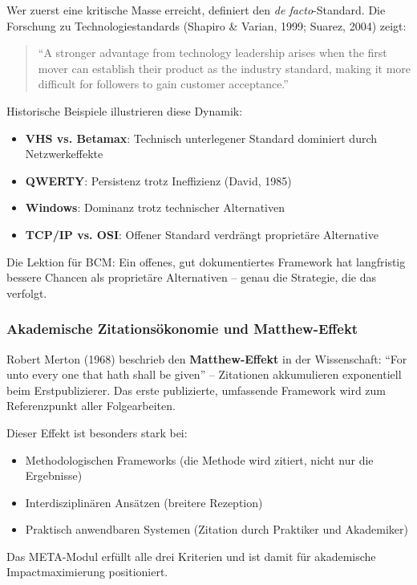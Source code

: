 Wer zuerst eine kritische Masse erreicht, definiert den \textit{de facto}-Standard. Die Forschung zu Technologiestandards (Shapiro \& Varian, 1999; Suarez, 2004) zeigt:

\begin{quote}
``A stronger advantage from technology leadership arises when the first mover can establish their product as the industry standard, making it more difficult for followers to gain customer acceptance.''
\end{quote}

Historische Beispiele illustrieren diese Dynamik:
\begin{itemize}
    \item \textbf{VHS vs. Betamax}: Technisch unterlegener Standard dominiert durch Netzwerkeffekte
    \item \textbf{QWERTY}: Persistenz trotz Ineffizienz (David, 1985)
    \item \textbf{Windows}: Dominanz trotz technischer Alternativen
    \item \textbf{TCP/IP vs. OSI}: Offener Standard verdrängt proprietäre Alternative
\end{itemize}

Die Lektion für BCM: Ein offenes, gut dokumentiertes Framework hat langfristig bessere Chancen als proprietäre Alternativen -- genau die Strategie, die das \BCM{} verfolgt.

\subsubsection{Akademische Zitationsökonomie und Matthew-Effekt}

Robert Merton (1968) beschrieb den \textbf{Matthew-Effekt} in der Wissenschaft: ``For unto every one that hath shall be given'' -- Zitationen akkumulieren exponentiell beim Erstpublizierer. Das erste publizierte, umfassende Framework wird zum Referenzpunkt aller Folgearbeiten.

Dieser Effekt ist besonders stark bei:
\begin{itemize}
    \item Methodologischen Frameworks (die Methode wird zitiert, nicht nur die Ergebnisse)
    \item Interdisziplinären Ansätzen (breitere Rezeption)
    \item Praktisch anwendbaren Systemen (Zitation durch Praktiker und Akademiker)
\end{itemize}

Das \BCM{} META-Modul erfüllt alle drei Kriterien und ist damit für akademische Impactmaximierung positioniert.

